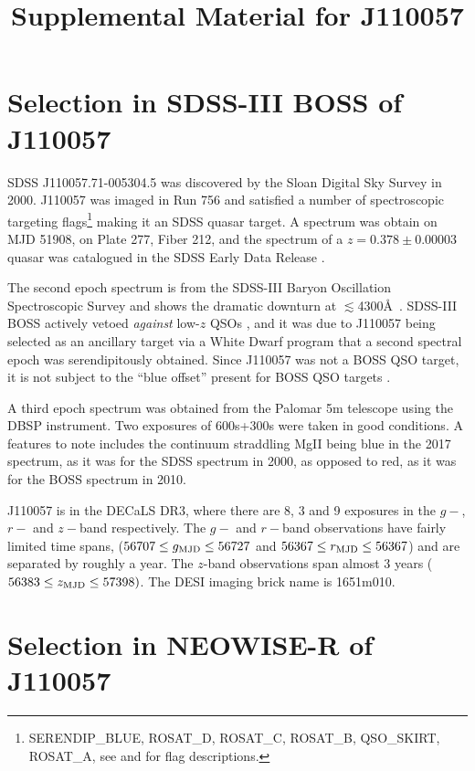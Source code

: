 \documentclass[11pt,a4paper]{article}
\begin{document}
   \title{Supplemental Material for J110057}
\maketitle


\section*{Selection in SDSS-III BOSS of J110057}
SDSS J110057.71-005304.5 was discovered by the Sloan Digital Sky
Survey in 2000.  J110057 was imaged in Run 756 and satisfied a number
of spectroscopic targeting flags\footnote{SERENDIP\_BLUE, ROSAT\_D,
ROSAT\_C, ROSAT\_B, QSO\_SKIRT, ROSAT\_A, see \citet{EDR} and
\citet{Richards2002} for flag descriptions.}  making it an SDSS quasar
target. A spectrum was obtain on MJD 51908, on Plate 277, Fiber 212,
and the spectrum of a $z=0.378\pm0.00003$ quasar was catalogued 
in the SDSS Early Data Release \citep{Schneider2002}.

The second epoch spectrum is from the SDSS-III Baryon Oscillation
Spectroscopic Survey \citep[BOSS; ][]{Dawson2013} and shows the dramatic
downturn at $\lesssim$4300\AA\ .  SDSS-III BOSS actively vetoed {\it
against} low-$z$ QSOs \citep{Ross2012}, and it was due to J110057 being
selected as an ancillary target via a White Dwarf program
\citep{Kepler2015, Kepler2016} that a second spectral epoch was serendipitously
obtained.  Since J110057 was not a BOSS QSO target, it is not subject
to the ``blue offset'' present for BOSS QSO targets \citep{Margala2016}.

A third epoch spectrum was obtained from the Palomar 5m telescope
using the DBSP instrument.  Two exposures of 600s+300s were taken in
good conditions.  A features to note includes the continuum straddling
MgII being blue in the 2017 spectrum, as it was for the SDSS spectrum
in 2000, as opposed to red, as it was for the BOSS spectrum in 2010.

J110057 is in the DECaLS DR3, where there are 8, 3 and 9 exposures in
the $g-$, $r-$ and $z-$band respectively. The $g-$ and $r-$band
observations have fairly limited time spans, ($56707 \leq g_{\rm MJD}
\leq 56727$ and $56367 \leq r_{\rm MJD} \leq 56367$) and are separated
by roughly a year. The $z$-band observations span almost 3 years
($56383 \leq z_{\rm MJD} \leq 57398)$.  The DESI imaging brick name is
1651m010.


\section*{Selection in NEOWISE-R of J110057}
\end{document}
